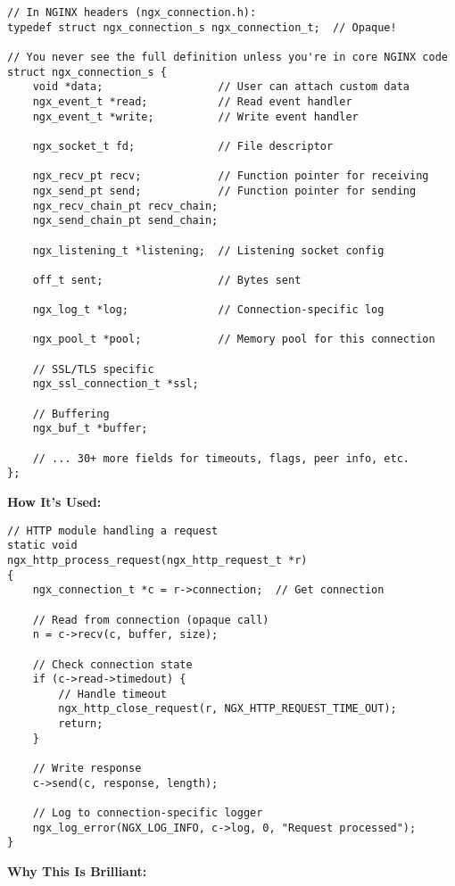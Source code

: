 \begin{lstlisting}
// In NGINX headers (ngx_connection.h):
typedef struct ngx_connection_s ngx_connection_t;  // Opaque!

// You never see the full definition unless you're in core NGINX code
struct ngx_connection_s {
    void *data;                  // User can attach custom data
    ngx_event_t *read;           // Read event handler
    ngx_event_t *write;          // Write event handler

    ngx_socket_t fd;             // File descriptor

    ngx_recv_pt recv;            // Function pointer for receiving
    ngx_send_pt send;            // Function pointer for sending
    ngx_recv_chain_pt recv_chain;
    ngx_send_chain_pt send_chain;

    ngx_listening_t *listening;  // Listening socket config

    off_t sent;                  // Bytes sent

    ngx_log_t *log;              // Connection-specific log

    ngx_pool_t *pool;            // Memory pool for this connection

    // SSL/TLS specific
    ngx_ssl_connection_t *ssl;

    // Buffering
    ngx_buf_t *buffer;

    // ... 30+ more fields for timeouts, flags, peer info, etc.
};
\end{lstlisting}

\textbf{How It's Used:}

\begin{lstlisting}
// HTTP module handling a request
static void
ngx_http_process_request(ngx_http_request_t *r)
{
    ngx_connection_t *c = r->connection;  // Get connection

    // Read from connection (opaque call)
    n = c->recv(c, buffer, size);

    // Check connection state
    if (c->read->timedout) {
        // Handle timeout
        ngx_http_close_request(r, NGX_HTTP_REQUEST_TIME_OUT);
        return;
    }

    // Write response
    c->send(c, response, length);

    // Log to connection-specific logger
    ngx_log_error(NGX_LOG_INFO, c->log, 0, "Request processed");
}
\end{lstlisting}

\textbf{Why This Is Brilliant:}

